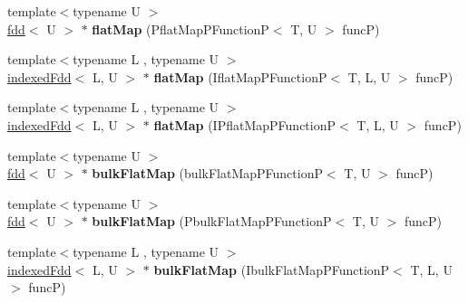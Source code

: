 \begin{DoxyCompactItemize}
\hypertarget{classfaster_1_1fdd_3_01T_01_5_01_4_a5fad18905c1f51701c823959d520b075}{}\label{classfaster_1_1fdd_3_01T_01_5_01_4_a5fad18905c1f51701c823959d520b075} 
{\footnotesize template$<$typename U $>$ }\\\hyperlink{classfaster_1_1fdd}{fdd}$<$ U $>$ $\ast$ {\bfseries flat\+Map} (Pflat\+Map\+P\+FunctionP$<$ T, U $>$ funcP)
\item 
\hypertarget{classfaster_1_1fdd_3_01T_01_5_01_4_a03c1134e4e6770f0dad78d073ad36c48}{}\label{classfaster_1_1fdd_3_01T_01_5_01_4_a03c1134e4e6770f0dad78d073ad36c48} 
{\footnotesize template$<$typename L , typename U $>$ }\\\hyperlink{classfaster_1_1indexedFdd}{indexed\+Fdd}$<$ L, U $>$ $\ast$ {\bfseries flat\+Map} (Iflat\+Map\+P\+FunctionP$<$ T, L, U $>$ funcP)
\item 
\hypertarget{classfaster_1_1fdd_3_01T_01_5_01_4_a4d183f4e1d6545769022d805a2d841f6}{}\label{classfaster_1_1fdd_3_01T_01_5_01_4_a4d183f4e1d6545769022d805a2d841f6} 
{\footnotesize template$<$typename L , typename U $>$ }\\\hyperlink{classfaster_1_1indexedFdd}{indexed\+Fdd}$<$ L, U $>$ $\ast$ {\bfseries flat\+Map} (I\+Pflat\+Map\+P\+FunctionP$<$ T, L, U $>$ funcP)
\item 
\hypertarget{classfaster_1_1fdd_3_01T_01_5_01_4_a7519a944f8bef5f27466d341f39bbb0e}{}\label{classfaster_1_1fdd_3_01T_01_5_01_4_a7519a944f8bef5f27466d341f39bbb0e} 
{\footnotesize template$<$typename U $>$ }\\\hyperlink{classfaster_1_1fdd}{fdd}$<$ U $>$ $\ast$ {\bfseries bulk\+Flat\+Map} (bulk\+Flat\+Map\+P\+FunctionP$<$ T, U $>$ funcP)
\item 
\hypertarget{classfaster_1_1fdd_3_01T_01_5_01_4_a91e2f6a811a43d36a26e022d92704b3f}{}\label{classfaster_1_1fdd_3_01T_01_5_01_4_a91e2f6a811a43d36a26e022d92704b3f} 
{\footnotesize template$<$typename U $>$ }\\\hyperlink{classfaster_1_1fdd}{fdd}$<$ U $>$ $\ast$ {\bfseries bulk\+Flat\+Map} (Pbulk\+Flat\+Map\+P\+FunctionP$<$ T, U $>$ funcP)
\item 
\hypertarget{classfaster_1_1fdd_3_01T_01_5_01_4_ac930844af424e4434920531d285addaf}{}\label{classfaster_1_1fdd_3_01T_01_5_01_4_ac930844af424e4434920531d285addaf} 
{\footnotesize template$<$typename L , typename U $>$ }\\\hyperlink{classfaster_1_1indexedFdd}{indexed\+Fdd}$<$ L, U $>$ $\ast$ {\bfseries bulk\+Flat\+Map} (Ibulk\+Flat\+Map\+P\+FunctionP$<$ T, L, U $>$ funcP)
\item 

\end{DoxyCompactItemize}
